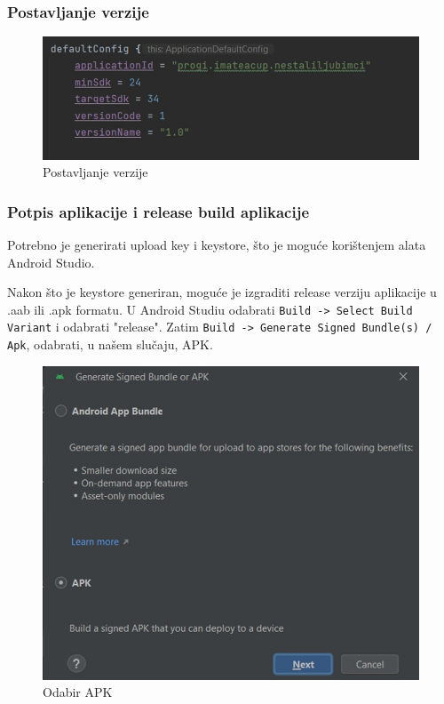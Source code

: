 		\subsubsection{Postavljanje verzije}
		
		\begin{figure}[H]
			\includegraphics[scale=0.5]{slike/deploy3.jpg} %
			\centering
			\caption{Postavljanje verzije}
			\label{fig:deploy3}
		\end{figure}
		
		\subsubsection{Potpis aplikacije i release build aplikacije}
		
		Potrebno je generirati upload key i keystore, što je moguće korištenjem alata Android Studio.
		
		Nakon što je keystore generiran, moguće je izgraditi release verziju aplikacije u .aab ili .apk formatu. U Android Studiu odabrati \texttt{Build -> Select Build Variant} i odabrati "release". Zatim \texttt{Build -> Generate Signed Bundle(s) / Apk}, odabrati, u našem slučaju, APK.
		
		\begin{figure}[H]
			\includegraphics[scale=0.45]{slike/deploy4.jpg} %
			\centering
			\caption{Odabir APK}
			\label{fig:deploy4}
		\end{figure}
		
